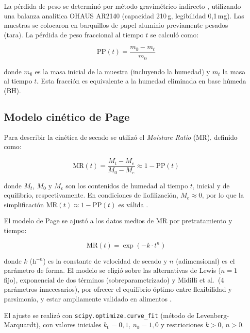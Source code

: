 \documentclass[12pt, a4paper]{article}
\begin{document}
La pérdida de peso se determinó por método gravimétrico indirecto \citep{garcia2012}, utilizando una balanza analítica OHAUS AR2140 (capacidad 210\,g, legibilidad 0{,}1\,mg). Las muestras se colocaron en barquillos de papel aluminio previamente pesados (tara). La pérdida de peso fraccional al tiempo $t$ se calculó como:

\begin{equation}
    \text{PP}(t) = \frac{m_0 - m_t}{m_0}
    \label{eq:perdida}
\end{equation}

\noindent donde $m_0$ es la masa inicial de la muestra (incluyendo la humedad) y $m_t$ la masa al tiempo $t$. Esta fracción es equivalente a la humedad eliminada en base húmeda (BH).

\subsection{Modelo cinético de Page}

Para describir la cinética de secado se utilizó el \textit{Moisture Ratio} (MR), definido como:

\begin{equation}
    \text{MR}(t) = \frac{M_t - M_e}{M_0 - M_e} \approx 1 - \text{PP}(t)
    \label{eq:MR}
\end{equation}

\noindent donde $M_t$, $M_0$ y $M_e$ son los contenidos de humedad al tiempo $t$, inicial y de equilibrio, respectivamente. En condiciones de liofilización, $M_e \approx 0$, por lo que la simplificación $\text{MR}(t) \approx 1 - \text{PP}(t)$ es válida \citep{liapis2007,ratti2001}.

El modelo de Page \citep{page1949} se ajustó a los datos medios de MR por pretratamiento y tiempo:

\begin{equation}
    \text{MR}(t) = \exp\!\left(-k \cdot t^n\right)
    \label{eq:page}
\end{equation}

\noindent donde $k$ (h$^{-n}$) es la constante de velocidad de secado y $n$ (adimensional) es el parámetro de forma. El modelo se eligió sobre las alternativas de Lewis ($n = 1$ fijo), exponencial de dos términos (sobreparametrizado) y Midilli et al.\ (4 parámetros innecesarios), por ofrecer el equilibrio óptimo entre flexibilidad y parsimonia, y estar ampliamente validado en alimentos \citep{doymaz2004,midilli2002,aral2016}.

El ajuste se realizó con \texttt{scipy.optimize.curve\_fit} (método de Levenberg-Marquardt), con valores iniciales $k_0 = 0{,}1$, $n_0 = 1{,}0$ y restricciones $k > 0$, $n > 0$.
\end{document}
